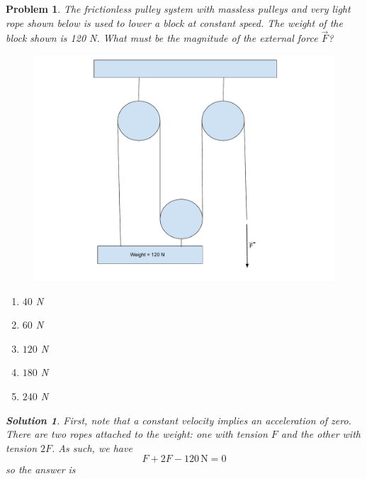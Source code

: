 \documentclass[12pt]{article}
\newcommand{\clearpts}{\addtocounter{tpts}{\value{cpts}} \setcounter{cpts}{0}}
\newcommand{\pts}[1]{\clearpts \setcounter{cpts}{#1}}
\newtheorem*{solution}{Solution}
\theoremstyle{mystyle}
\newtheorem{pproblem}{Problem}
\begin{document}
\pts{2}
\begin{pproblem}
    The frictionless pulley system with massless pulleys and very light rope shown below is used to lower a block at constant speed. The weight of the block shown is 120 N. What must be the magnitude of the external force $\Vec{F}$?
    \begin{figure}[H]
        \centering
        \includegraphics[scale=0.5]{PulleyDrawing2.pdf}
    \end{figure}
    \begin{enumerate}[label=(\Alph*)]
        \item $40$ N
        \item $60$ N
        \item $120$ N
        \item $180$ N
        \item $240$ N
    \end{enumerate}
    
    \begin{solution}
        First, note that a constant velocity implies an acceleration of zero.
        There are two ropes attached to the weight: one with
        tension $F$ and the other with tension $2F$. As such,
        we have \[
            F+2F-120\,\mathrm{N}=0
        \]
        so the answer is 
    \end{solution}
\end{pproblem}
\end{document}
